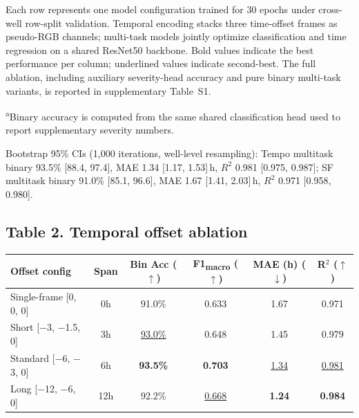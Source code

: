 \documentclass[12pt,letterpaper]{article}
\begin{document}
\bigskip

Each row represents one model configuration trained for 30 epochs under cross-well row-split validation. Temporal encoding stacks three time-offset frames as pseudo-RGB channels; multi-task models jointly optimize classification and time regression on a shared ResNet50 backbone. Bold values indicate the best performance per column; underlined values indicate second-best. The full ablation, including auxiliary severity-head accuracy and pure binary multi-task variants, is reported in supplementary Table~S1.

\medskip\noindent\textsuperscript{a}Binary accuracy is computed from the same shared classification head used to report supplementary severity numbers.

\medskip\noindent Bootstrap 95\% CIs (1,000 iterations, well-level resampling): Tempo multitask binary 93.5\% [88.4, 97.4], MAE 1.34 [1.17, 1.53]\,h, $R^2$ 0.981 [0.975, 0.987]; SF multitask binary 91.0\% [85.1, 96.6], MAE 1.67 [1.41, 2.03]\,h, $R^2$ 0.971 [0.958, 0.980].

\newpage

\subsection*{Table 2. Temporal offset ablation}

\begin{tabular}{lccccc}
\toprule
\textbf{Offset config} & \textbf{Span} & \textbf{Bin Acc ($\uparrow$)} & \textbf{F1\textsubscript{macro} ($\uparrow$)} & \textbf{MAE (h) ($\downarrow$)} & \textbf{R$^2$ ($\uparrow$)} \\
\midrule
Single-frame [0, 0, 0]   & 0h  & 91.0\%             & 0.633             & 1.67             & 0.971           \\
Short [$-$3, $-$1.5, 0]  & 3h  & \underline{93.0\%} & 0.648             & 1.45             & 0.979           \\
Standard [$-$6, $-$3, 0] & 6h  & \textbf{93.5\%}    & \textbf{0.703}    & \underline{1.34} & \underline{0.981} \\
Long [$-$12, $-$6, 0]    & 12h & 92.2\%             & \underline{0.668} & \textbf{1.24}    & \textbf{0.984}  \\
\bottomrule
\end{tabular}

\bigskip
\end{document}

